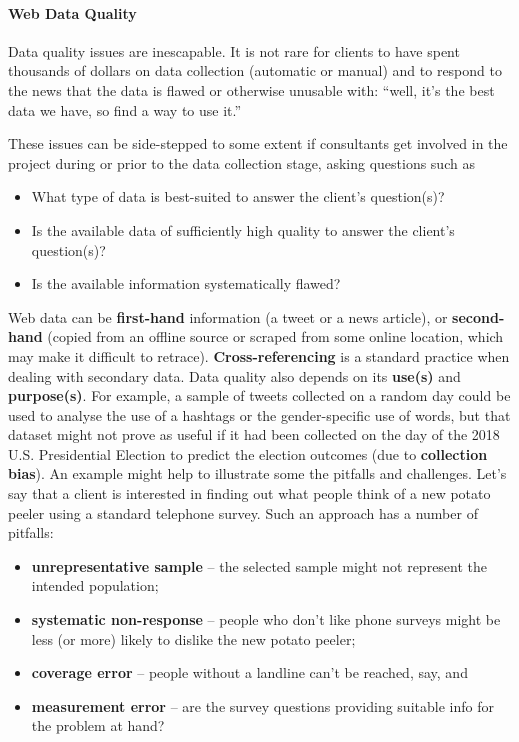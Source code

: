 \paragraph{Web Data Quality} Data quality issues are inescapable. It is not rare for clients to have spent thousands of dollars on data collection (automatic or manual) and to respond to the news that the data is flawed or otherwise unusable with: ``well, it's the best data we have, so find a way to use it.''\par These issues can be side-stepped to some extent if consultants get involved in the project during or prior to the data collection stage, asking questions such as 
\begin{itemize}[noitemsep]
    \item What type of data is best-suited to answer the client's question(s)?
    \item Is the available data of sufficiently high quality to answer the client's question(s)?
    \item Is the available information systematically flawed?
\end{itemize}
Web data can be \textbf{first-hand} information (a tweet or a news article), or \textbf{second-hand} (copied from an offline source or scraped from some online location, which may make it difficult to retrace). \textbf{Cross-referencing} is a standard practice when dealing with secondary data.  \newl Data quality also depends on its \textbf{use(s)} and \textbf{purpose(s)}. For example,
a sample of tweets collected on a random day could be used to analyse the use of a hashtags or the gender-specific use of words, but that dataset might not prove as useful if it had been collected on the day of the 2018 U.S. Presidential Election to predict the election outcomes (due to \textbf{collection bias}).
\newpage\noindent An example might help to illustrate some the pitfalls and challenges. Let's say that a client is interested in finding out what people think of a new potato peeler using a standard telephone survey. 
Such an approach has a number of pitfalls:
\begin{itemize}[noitemsep]
\item\textbf{unrepresentative sample} -- the selected sample might not represent the intended population;
\item\textbf{systematic non-response} -- people who don't like phone surveys might be less (or more) likely to dislike the new potato peeler;  
\item\textbf{coverage error} -- people without a landline can't be reached, say, and 
\item\textbf{measurement error} -- are the survey questions providing suitable info for the problem at hand?
\end{itemize}
